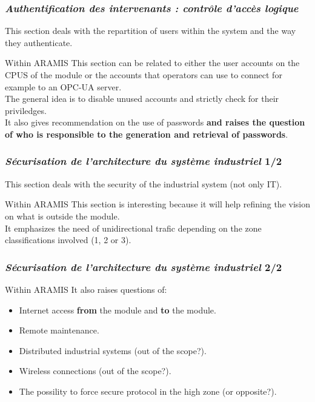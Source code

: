 \begin{frame}
    \frametitle{{\em Authentification des intervenants : contr\^ole d'acc\`es logique}}

    This section deals with the repartition of users within the system and the way they authenticate.
    \vfill
    \begin{block}{Within ARAMIS}
        This section can be related to either the user accounts on the CPUS of the module or the accounts that operators can use to connect for example to an OPC-UA server.\\
        \medskip
        The general idea is to disable unused accounts and strictly check for their priviledges.\\
        It also gives recommendation on the use of passwords {\bf and raises the question of who is responsible to the generation and retrieval of passwords}.
    \end{block}
\end{frame}

\begin{frame}
    \frametitle{{\em S\'ecurisation de l'architecture du syst\`eme industriel} 1/2}

    This section deals with the security of the industrial system (not only IT).
    \vfill
    \begin{block}{Within ARAMIS}
        This section is interesting because it will help refining the vision on what is outside the module.\\
        \medskip
        It emphasizes the need of unidirectional trafic depending on the zone classifications involved (1, 2 or 3).\\
    \end{block}
\end{frame}

\begin{frame}
    \frametitle{{\em S\'ecurisation de l'architecture du syst\`eme industriel} 2/2}
    
    \begin{block}{Within ARAMIS}
        It also raises questions of:
        \begin{itemize}
            \item Internet access {\bf from} the module and {\bf to} the module.
            \item Remote maintenance.
            \item Distributed industrial systems (out of the scope?).
            \item Wireless connections (out of the scope?).
            \item The possility to force secure protocol in the high zone (or opposite?).
        \end{itemize}
    \end{block}
\end{frame}

